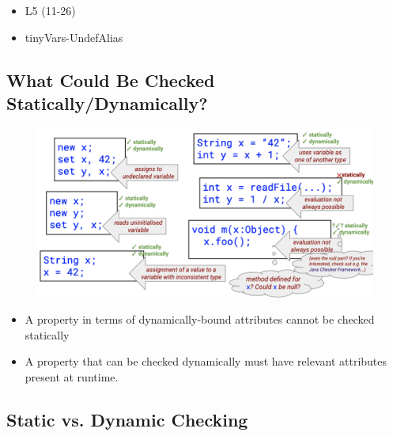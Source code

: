 \documentclass{article}
\begin{document}
\begin{itemize}
    \item L5 (11-26)
    \item tinyVars-UndefAlias
\end{itemize}

\subsection{What Could Be Checked Statically/Dynamically?}

\begin{figure}[H]
    \centering
    \includegraphics[width=\textwidth]{what_could_be_checked}
\end{figure}

\begin{itemize}
    \item A property in terms of dynamically-bound attributes cannot be checked statically
    \item A property that can be checked dynamically must have relevant attributes present at runtime.
\end{itemize}

\subsection{Static vs. Dynamic Checking}
\end{document}
